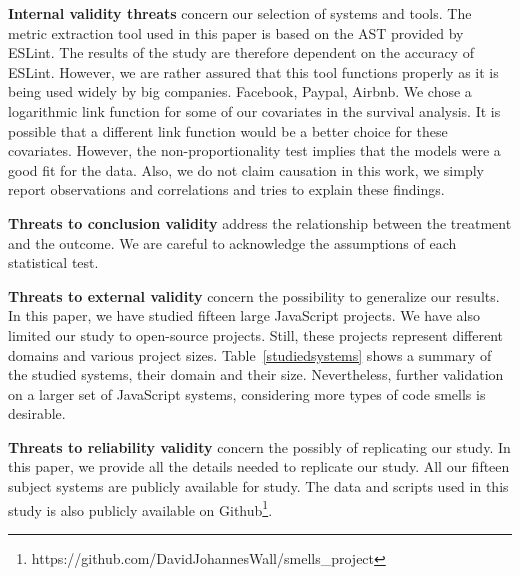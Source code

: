 \textbf{Internal validity threats} concern our selection of systems and tools. %
The metric extraction tool used in this paper is based on the AST provided by ESLint. The results of the study are therefore dependent on the accuracy of ESLint. However, we are rather assured that this tool functions properly as it is being used widely by big companies. \eg{} Facebook, Paypal, Airbnb.
We chose a logarithmic link function for some of our covariates in the survival analysis. It is possible that a different link function would be a better choice for these covariates. However, the non-proportionality test implies that the models were a good fit for the data. %
Also, we do not claim causation in this work, we simply report observations and correlations and tries to explain these findings.

\textbf{Threats to conclusion validity} address the relationship between the treatment and the outcome. We are careful to acknowledge the assumptions of each statistical test.

\textbf{Threats to external validity} concern the possibility to generalize our results. In this paper, we have studied {\color{blue}fifteen} large JavaScript projects. We have also limited our study to open-source projects. Still, these projects represent different domains and various project sizes. Table~\ref{studiedsystems} shows a summary of the studied systems, their domain and their size. Nevertheless, further validation on a larger set of JavaScript systems, considering more types of code smells is desirable. %

\textbf{Threats to reliability validity} concern the possibly of replicating our study. In this paper, we provide all the details needed to replicate our study. All our {\color{blue}fifteen} subject systems are publicly available for study. The data and scripts used in this study is also publicly available on Github\footnote{https://github.com/DavidJohannesWall/smells\_project}.

